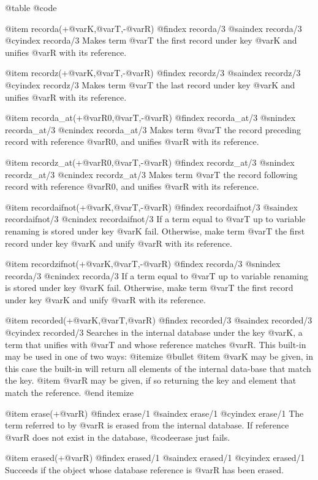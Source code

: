 {{{{{{@table @code

@item recorda(+@var{K},@var{T},-@var{R})
@findex recorda/3
@saindex recorda/3
@cyindex recorda/3
Makes term @var{T} the first record under key @var{K} and  unifies @var{R}
with its reference.

@item recordz(+@var{K},@var{T},-@var{R})
@findex recordz/3
@saindex recordz/3
@cyindex recordz/3
Makes term @var{T} the last record under key @var{K} and unifies @var{R}
with its reference.

@item recorda_at(+@var{R0},@var{T},-@var{R})
@findex recorda_at/3
@snindex recorda_at/3
@cnindex recorda_at/3
Makes term @var{T} the record preceding record with reference
@var{R0}, and unifies @var{R} with its reference.

@item recordz_at(+@var{R0},@var{T},-@var{R})
@findex recordz_at/3
@snindex recordz_at/3
@cnindex recordz_at/3
Makes term @var{T} the record following record with reference
@var{R0}, and unifies @var{R} with its reference.

@item recordaifnot(+@var{K},@var{T},-@var{R})
@findex recordaifnot/3
@saindex recordaifnot/3
@cnindex recordaifnot/3
If a term equal to @var{T} up to variable renaming is stored under key
@var{K} fail. Otherwise, make term @var{T} the first record under key
@var{K} and unify @var{R} with its reference.

@item recordzifnot(+@var{K},@var{T},-@var{R})
@findex recorda/3
@snindex recorda/3
@cnindex recorda/3
If a term equal to @var{T} up to variable renaming is stored under key
@var{K} fail. Otherwise, make term @var{T} the first record under key
@var{K} and unify @var{R} with its reference.

@item recorded(+@var{K},@var{T},@var{R})
@findex recorded/3
@saindex recorded/3
@cyindex recorded/3
Searches in the internal database under the key @var{K}, a term that
unifies with @var{T} and whose reference matches @var{R}. This
built-in may be used in one of two ways:
@itemize @bullet
@item @var{K} may be given, in this case the built-in will return all
elements of the internal data-base that match the key.
@item @var{R} may be given, if so returning the key and element that
match the reference.
@end itemize

@item erase(+@var{R})
@findex erase/1
@saindex erase/1
@cyindex erase/1
The term referred to by @var{R} is erased from the internal database. If
reference @var{R} does not exist in the database, @code{erase} just fails.

@item erased(+@var{R})
@findex erased/1
@saindex erased/1
@cyindex erased/1
Succeeds if the object whose database reference is @var{R} has been
erased.

}}}}}}
